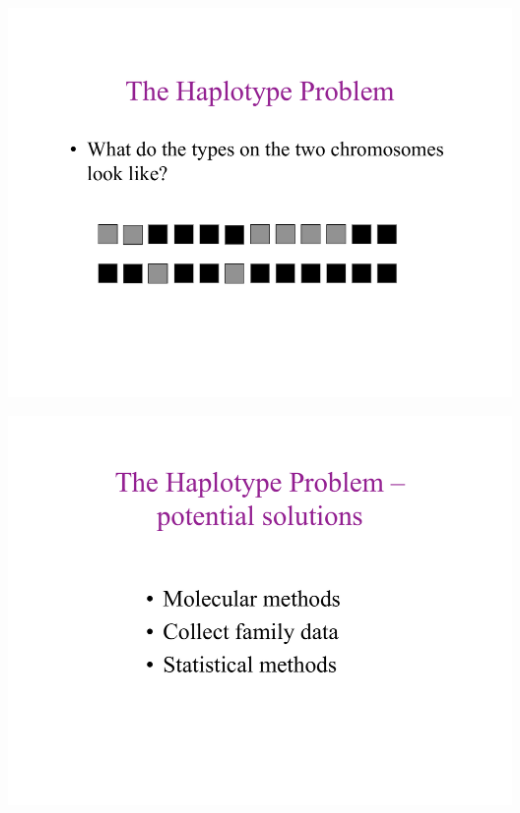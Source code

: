 \newslide{}
\mbox{}
\vspace*{\VertUp}
\enlargethispage*{1000pt}
\begin{center}
\includegraphics*[width=\textwidth]{PPT_pages/pg_0009.pdf}
\end{center}


\newslide{}
\mbox{}
\vspace*{\VertUp}
\enlargethispage*{1000pt}
\begin{center}
\includegraphics*[width=\textwidth]{PPT_pages/pg_0010.pdf}
\end{center}


